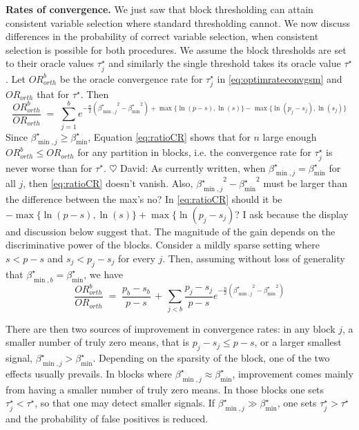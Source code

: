 \documentclass[aos]{imsart}
\theoremstyle{plain}
\newcommand{\david}[1]{{\small{\color{blue} \sf $\heartsuit$ David: #1}}}
\begin{document}
\bigskip

\noindent\textbf{Rates of convergence.}   We just saw that block thresholding can attain consistent variable selection where standard thresholding cannot. We now discuss differences in the probability of correct variable selection, when consistent selection is possible for both procedures. We assume the block thresholds %
are set to their oracle values $\tau_j^\star$ %
and similarly the single threshold %
takes its oracle value $\tau^\star$.
Let ${OR}^b_{orth}$ be the oracle convergence rate for $\tau_j^\star$ %
in \eqref{eq:optimrateconvgsm} and ${OR}_{orth}$ that for $\tau^\star$. %
Then
\begin{equation}\label{eq:ratioCR}
    \frac{{OR}^b_{orth}}{{OR}_{orth}}\;=\;\sum_{j=1}^be^{-\frac{n}{2}\left({\beta^\star_{\min,j}}^2-{\beta_{\min}^\star}^2\right)+\max\{\ln(p-s),\ln(s)\}-\max\{\ln(p_j-s_j),\ln(s_j)\}}
\end{equation}
Since $\beta_{\min,j}^\star \geq \beta_{\min}^\star$, Equation \eqref{eq:ratioCR} shows that for $n$ large enough ${OR}^b_{orth} \leq {OR}_{orth}$ for any partition in blocks, i.e. the convergence rate for $\tau_j^\star$ is never worse than for $\tau^\star$. \david{As currently written, when $\beta_{\min,j}^\star = \beta_{\min}^\star$ for all $j$, then \eqref{eq:ratioCR} doesn't vanish. Also, ${\beta^\star_{\min,j}}^2-{\beta_{\min}^\star}^2$ must be larger than the difference between the max's no? In \eqref{eq:ratioCR} should it be $-\max\{\ln(p-s),\ln(s)\}+\max\{\ln(p_j-s_j)$? I ask because the display and discussion below suggest that.}
The magnitude of the gain depends on the discriminative power of the blocks.
Consider a mildly sparse setting where $s<p-s$ and $s_j<p_j-s_j$ for every $j$. Then, assuming without loss of generality that $\beta_{\min,b}^\star=\beta_{\min}^\star$, we have
\begin{equation*}
    \frac{{OR}^b_{orth}}{{OR}_{orth}}\;=\; \frac{p_b-s_b}{p-s} \,+\,\sum_{j<b}\frac{p_j-s_j}{p-s}e^{-\frac{n}{2}\left({\beta^\star_{\min,j}}^2-{\beta_{\min}^\star}^2\right)}
\end{equation*}

There are then two sources of improvement in convergence rates: in any block $j$, a smaller number of truly zero means, that is $p_j-s_j\leq p-s$, or a larger smallest signal, $\beta^\star_{\min,j} > \beta_{\min}^\star$. Depending on the sparsity of the block, one of the two effects usually prevails. In blocks where $\beta^\star_{\min,j} \approx \beta_{\min}^\star$, improvement comes mainly from having a smaller number of truly zero means. In those blocks
one sets $\tau^\star_j < \tau^\star$, so that one may detect smaller signals. 
If %
$\beta^\star_{\min,j} \gg \beta_{\min}^\star$,
one sets $\tau^\star_j > \tau^\star$
and the probability of false positives is reduced.
\end{document}
